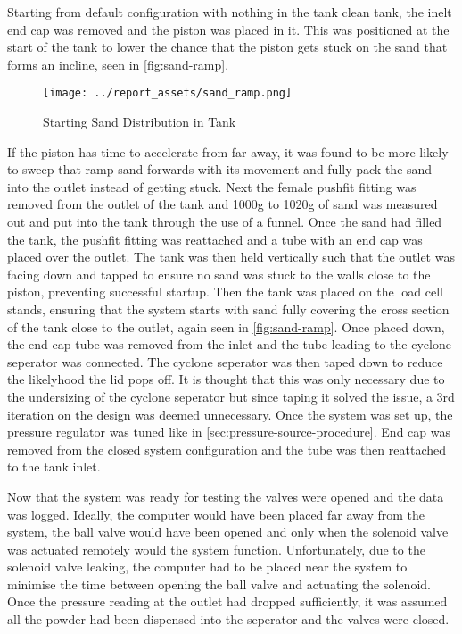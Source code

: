 Starting from default configuration with nothing in the tank clean tank, the inelt end cap was removed and the piston was placed in it. This was positioned at the start of the tank to lower the chance that the piston gets stuck on the sand that forms an incline, seen in \autoref{fig:sand-ramp}.
\begin{figure}[htbp]
    \centering
    
    \begin{minipage}{0.60\textwidth}
        \centering
        \texttt{[image: ../report\_assets/sand\_ramp.png]}
        \caption{Starting Sand Distribution in Tank}\label{fig:sand-ramp}
    \end{minipage}

\end{figure}
If the piston has time to accelerate from far away, it was found to be more likely to sweep that ramp sand forwards with its movement and fully pack the sand into the outlet instead of getting stuck. Next the female pushfit fitting was removed from the outlet of the tank and 1000g to 1020g of sand was measured out and put into the tank through the use of a funnel. Once the sand had filled the tank, the pushfit fitting was reattached and a tube with an end cap was placed over the outlet. The tank was then held vertically such that the outlet was facing down and tapped to ensure no sand was stuck to the walls close to the piston, preventing successful startup. Then the tank was placed on the load cell stands, ensuring that the system starts with sand fully covering the cross section of the tank close to the outlet, again seen in \autoref{fig:sand-ramp}. Once placed down, the end cap tube was removed from the inlet and the tube leading to the cyclone seperator was connected. The cyclone seperator was then taped down to reduce the likelyhood the lid pops off. It is thought that this was only necessary due to the undersizing of the cyclone seperator but since taping it solved the issue, a 3rd iteration on the design was deemed unnecessary. Once the system was set up, the pressure regulator was tuned like in \autoref{sec:pressure-source-procedure}. End cap was removed from the closed system configuration and the tube was then reattached to the tank inlet.

Now that the system was ready for testing the valves were opened and the data was logged. Ideally, the computer would have been placed far away from the system, the ball valve would have been opened and only when the solenoid valve was actuated remotely would the system function. Unfortunately, due to the solenoid valve leaking, the computer had to be placed near the system to minimise the time between opening the ball valve and actuating the solenoid. Once the pressure reading at the outlet had dropped sufficiently, it was assumed all the powder had been dispensed into the seperator and the valves were closed.
